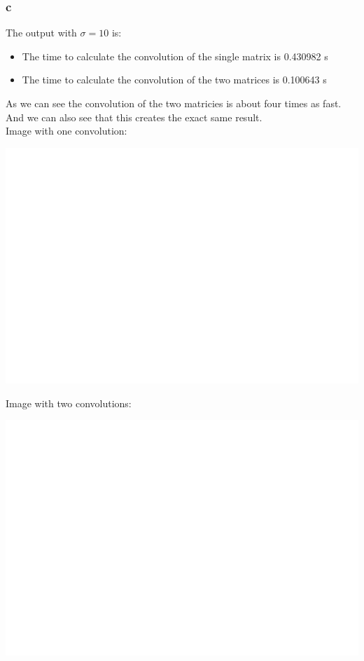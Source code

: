 \documentclass[11pt]{article}
\begin{document}
\subsubsection{c}
\label{sec:org2065771}
The output with \(\sigma=10\) is:
\begin{itemize}
\item The time to calculate the convolution of the single matrix is 0.430982 s
\item The time to calculate the convolution of the two matrices is 0.100643 s
\end{itemize}
As we can see the convolution of the two matricies is about four times as fast. And we can also see that this creates the exact same result.\\
Image with one convolution:
\begin{center}
\includegraphics[width=.9\linewidth]{ENG204-Assignment-3-Single-sigma-10.png}
\end{center}
Image with two convolutions:
\begin{center}
\includegraphics[width=.9\linewidth]{ENG204-Assignment-3-Double-sigma-10.png}
\end{center}
\end{document}

